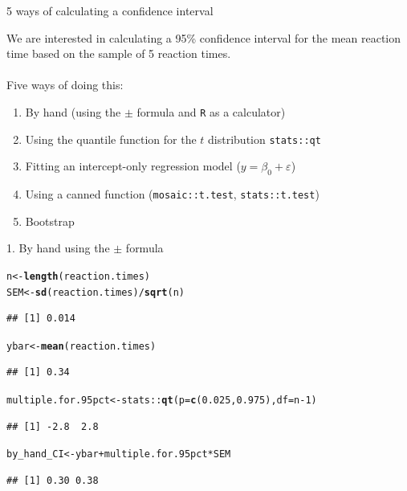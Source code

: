 \documentclass[10pt,handout]{beamer}\usepackage[]{graphicx}\usepackage[]{color}
\makeatletter
\newcommand{\hlnum}[1]{\textcolor[rgb]{0.686,0.059,0.569}{#1}}%
\newcommand{\hlopt}[1]{\textcolor[rgb]{0,0,0}{#1}}%
\newcommand{\hlstd}[1]{\textcolor[rgb]{0.345,0.345,0.345}{#1}}%
\newcommand{\hlkwb}[1]{\textcolor[rgb]{0.69,0.353,0.396}{#1}}%
\newcommand{\hlkwc}[1]{\textcolor[rgb]{0.333,0.667,0.333}{#1}}%
\newcommand{\hlkwd}[1]{\textcolor[rgb]{0.737,0.353,0.396}{\textbf{#1}}}%
\newenvironment{kframe}{%
 \def\at@end@of@kframe{}%
 \ifinner\ifhmode%
  \def\at@end@of@kframe{\end{minipage}}%
  \begin{minipage}{\columnwidth}%
 \fi\fi%
 \def\FrameCommand##1{\hskip\@totalleftmargin \hskip-\fboxsep
 \colorbox{shadecolor}{##1}\hskip-\fboxsep
     \hskip-\linewidth \hskip-\@totalleftmargin \hskip\columnwidth}%
 \MakeFramed {\advance\hsize-\width
   \@totalleftmargin\z@ \linewidth\hsize
   \@setminipage}}%
 {\par\unskip\endMakeFramed%
 \at@end@of@kframe}
\newenvironment{knitrout}{}{} %
\makeatother
\begin{document}
\begin{frame}[fragile]{5 ways of calculating a confidence interval}
	
	We are interested in calculating a 95\% confidence interval for the mean reaction time based on the sample of 5 reaction times. \\ \ \\
	\pause
	Five ways of doing this:
	\begin{enumerate}
		\setlength\itemsep{1em}
		\item By hand (using the $\pm$ formula and \texttt{R} as a calculator)
		\item Using the quantile function for the $t$ distribution \texttt{stats::qt}
		\item Fitting an intercept-only regression model ($y = \beta_0 + \varepsilon$)
		\item Using a canned function (\texttt{mosaic::t.test}, \texttt{stats::t.test})
		\item Bootstrap
	\end{enumerate}
	
\end{frame}

\begin{frame}[fragile]{1. By hand using the $\pm$ formula}
\begin{knitrout}\tiny
{}\color{fgcolor}\begin{kframe}
\begin{alltt}
\hlstd{n} \hlkwb{<-} \hlkwd{length}\hlstd{(reaction.times)}
\hlstd{SEM} \hlkwb{<-} \hlkwd{sd}\hlstd{(reaction.times)}\hlopt{/}\hlkwd{sqrt}\hlstd{(n)}
\end{alltt}
\begin{verbatim}
## [1] 0.014
\end{verbatim}
\begin{alltt}
\hlstd{ybar} \hlkwb{<-} \hlkwd{mean}\hlstd{(reaction.times)}
\end{alltt}
\begin{verbatim}
## [1] 0.34
\end{verbatim}
\begin{alltt}
\hlstd{multiple.for.95pct} \hlkwb{<-} \hlstd{stats}\hlopt{::}\hlkwd{qt}\hlstd{(}\hlkwc{p} \hlstd{=} \hlkwd{c}\hlstd{(}\hlnum{0.025}\hlstd{,} \hlnum{0.975}\hlstd{),} \hlkwc{df} \hlstd{= n}\hlopt{-}\hlnum{1}\hlstd{)}
\end{alltt}
\begin{verbatim}
## [1] -2.8  2.8
\end{verbatim}
\begin{alltt}
\hlstd{by_hand_CI} \hlkwb{<-} \hlstd{ybar} \hlopt{+} \hlstd{multiple.for.95pct} \hlopt{*} \hlstd{SEM}
\end{alltt}
\begin{verbatim}
## [1] 0.30 0.38
\end{verbatim}
\end{kframe}
\end{knitrout}
\end{frame}
\end{document}
